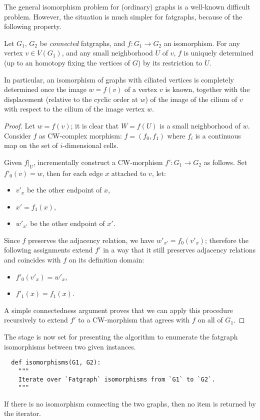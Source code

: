The general isomorphism problem for (ordinary) graphs is a well-known
difficult problem. However, the situation is much simpler for
fatgraphs, because of the following property.
\begin{lemma}\label{lemma:rigidity}
  Let $G_1$, $G_2$ be \emph{connected} fatgraphs, and $f: G_1 \to G_2$
  an isomorphism.  For any vertex $v \in V(G_1)$, and any small
  neighborhood $U$ of $v$, $f$ is uniquely determined (up to an
  homotopy fixing the vertices of $G$) by its restriction to $U$.
\end{lemma}
In particular, an isomorphism of graphs with ciliated vertices is
completely determined once the image $w=f(v)$ of a vertex $v$ is
known, together with the displacement (relative to the cyclic order at
$w$) of the image of the cilium of $v$ with respect to the cilium of
the image vertex $w$.
\begin{proof}
  Let $w = f(v)$; it is clear that $W = f(U)$ is a small neighborhood
  of $w$.  Consider $f$ as CW-complex morphism: $f = (f_0, f_1)$ where
  $f_i$ is a continuous map on the set of $i$-dimensional cells.

  Given $f|_U$, incrementally construct a CW-morphism $f': G_1 \to
  G_2$ as follows. Set $f'_0(v) = w$, then for each edge $x$ attached
  to $v$, let:
  \begin{itemize}
  \item $v'_x$ be the other endpoint of $x$,
  \item $x' = f_1(x)$,
  \item $w'_{x'}$ be the other endpoint of $x'$.
  \end{itemize}
  Since $f$ preserves the adjacency relation, we have $w'_{x'} =
  f_0(v'_x)$; therefore the following assignments extend $f'$ in a way
  that it still preserves adjacency relations and coincides with $f$
  on its definition domain:
  \begin{itemize}
  \item $f'_0(v'_x) = w'_x$,
  \item $f'_1(x) = f_1(x)$.
  \end{itemize}

  A simple connectedness argument proves that we can apply this
  procedure recursively to extend $f'$ to a CW-morphism that agrees
  with $f$ on all of $G_1$.
\end{proof}

The stage is now set for presenting the algorithm to enumerate the
fatgraph isomorphisms between two given instances.
\begin{lstlisting}
  def isomorphisms(G1, G2):
    """
    Iterate over `Fatgraph` isomorphisms from `G1` to `G2`.
    """
\end{lstlisting}
If there is no isomorphism connecting the two graphs, then no
item is returned by the iterator.

